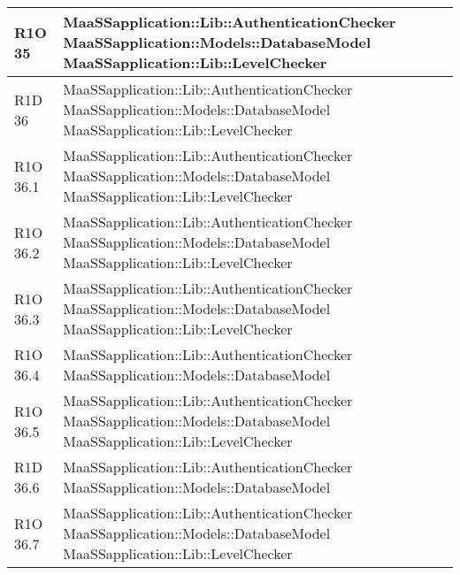 \begin{center}
\begin{longtable}{ | l | p{8cm} |}
    R1O 35 & MaaSSapplication::Lib::AuthenticationChecker \newline  MaaSSapplication::Models::DatabaseModel \newline MaaSSapplication::Lib::LevelChecker \\ \hline
    
    R1D 36 & MaaSSapplication::Lib::AuthenticationChecker \newline  MaaSSapplication::Models::DatabaseModel \newline MaaSSapplication::Lib::LevelChecker \\ \hline
        
    R1O 36.1 & MaaSSapplication::Lib::AuthenticationChecker \newline  MaaSSapplication::Models::DatabaseModel \newline MaaSSapplication::Lib::LevelChecker \\ \hline
   	      	
      	R1O 36.2 & MaaSSapplication::Lib::AuthenticationChecker \newline  MaaSSapplication::Models::DatabaseModel \newline MaaSSapplication::Lib::LevelChecker \\ \hline
      	
      	R1O 36.3 & MaaSSapplication::Lib::AuthenticationChecker \newline  MaaSSapplication::Models::DatabaseModel \newline MaaSSapplication::Lib::LevelChecker \\ \hline
   	    	
   	R1O 36.4 & MaaSSapplication::Lib::AuthenticationChecker \newline  MaaSSapplication::Models::DatabaseModel \\ \hline
   	
   	R1O 36.5 & MaaSSapplication::Lib::AuthenticationChecker \newline  MaaSSapplication::Models::DatabaseModel \newline MaaSSapplication::Lib::LevelChecker \\ \hline
   	
   	R1D 36.6 & MaaSSapplication::Lib::AuthenticationChecker \newline  MaaSSapplication::Models::DatabaseModel \\ \hline
   	
   	R1O 36.7 & MaaSSapplication::Lib::AuthenticationChecker \newline  MaaSSapplication::Models::DatabaseModel \newline MaaSSapplication::Lib::LevelChecker \\ \hline
   	

\end{longtable}
\end{center}
